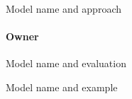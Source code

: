 \begin{frame}{Model name and approach}
\framesubtitle{Owner}
\end{frame}

\begin{frame}{Model name and evaluation}
\end{frame}

\begin{frame}{Model name and example}
\end{frame}
